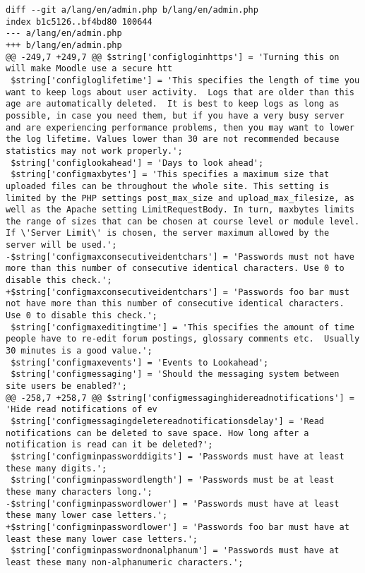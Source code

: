 \documentclass{article}
\begin{document}
\begin{verbatim}
diff --git a/lang/en/admin.php b/lang/en/admin.php
index b1c5126..bf4bd80 100644
--- a/lang/en/admin.php
+++ b/lang/en/admin.php
@@ -249,7 +249,7 @@ $string['configloginhttps'] = 'Turning this on will make Moodle use a secure htt
 $string['configloglifetime'] = 'This specifies the length of time you want to keep logs about user activity.  Logs that are older than this age are automatically deleted.  It is best to keep logs as long as possible, in case you need them, but if you have a very busy server and are experiencing performance problems, then you may want to lower the log lifetime. Values lower than 30 are not recommended because statistics may not work properly.';
 $string['configlookahead'] = 'Days to look ahead';
 $string['configmaxbytes'] = 'This specifies a maximum size that uploaded files can be throughout the whole site. This setting is limited by the PHP settings post_max_size and upload_max_filesize, as well as the Apache setting LimitRequestBody. In turn, maxbytes limits the range of sizes that can be chosen at course level or module level. If \'Server Limit\' is chosen, the server maximum allowed by the server will be used.';
-$string['configmaxconsecutiveidentchars'] = 'Passwords must not have more than this number of consecutive identical characters. Use 0 to disable this check.';
+$string['configmaxconsecutiveidentchars'] = 'Passwords foo bar must not have more than this number of consecutive identical characters. Use 0 to disable this check.';
 $string['configmaxeditingtime'] = 'This specifies the amount of time people have to re-edit forum postings, glossary comments etc.  Usually 30 minutes is a good value.';
 $string['configmaxevents'] = 'Events to Lookahead';
 $string['configmessaging'] = 'Should the messaging system between site users be enabled?';
@@ -258,7 +258,7 @@ $string['configmessaginghidereadnotifications'] = 'Hide read notifications of ev
 $string['configmessagingdeletereadnotificationsdelay'] = 'Read notifications can be deleted to save space. How long after a notification is read can it be deleted?';
 $string['configminpassworddigits'] = 'Passwords must have at least these many digits.';
 $string['configminpasswordlength'] = 'Passwords must be at least these many characters long.';
-$string['configminpasswordlower'] = 'Passwords must have at least these many lower case letters.';
+$string['configminpasswordlower'] = 'Passwords foo bar must have at least these many lower case letters.';
 $string['configminpasswordnonalphanum'] = 'Passwords must have at least these many non-alphanumeric characters.';

\end{verbatim}
\end{document}
